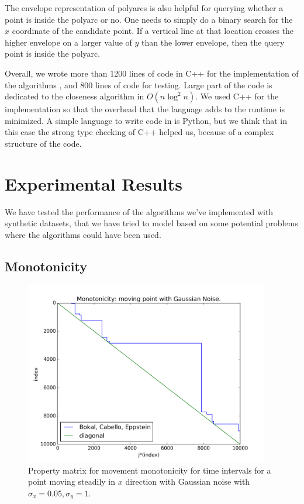 \documentclass{article}
\begin{document}
The envelope representation of polyarcs is also helpful for querying whether a point is inside the polyarc or no. One needs to simply do a binary search for the $x$ coordinate of the candidate point.
If a vertical line at that location crosses the higher envelope on a larger value of $y$ than the lower envelope, then the query point is inside the polyarc.

Overall, we wrote more than 1200 lines of code in C++ for the implementation of the algorithms \cite{report_code}, and 800 lines of code for testing. Large part of the code is dedicated to the closeness algorithm in $O(n \log^2 n)$. We used C++ for the implementation so that the overhead that the language adds to the runtime is minimized. A simple language to write code in is Python, but we think that in this case the strong type checking of C++ helped us, because of a complex structure of the code. 

\section{Experimental Results}
\label{sec:experiments}
We have tested the performance of the algorithms we've implemented with synthetic datasets, that we have tried to model based on some potential problems where the algorithms could have been used.

\subsection{Monotonicity}

\begin{figure}[!ht]
  \centering
  \includegraphics[height=8cm]{../plots/monotonicity_moving_gaussian}
  \caption{Property matrix for movement monotonicity for time intervals for a point moving steadily in $x$ direction with Gaussian noise with $\sigma_x = 0.05, \sigma_y = 1$.}
  \label{fig:monotonicity_demo}
\end{figure}
\end{document}

